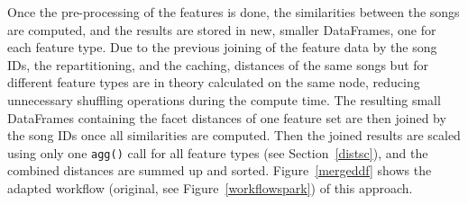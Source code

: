\noindent Once the pre-processing of the features is done, the similarities between the songs are computed, and the results are stored in new, smaller DataFrames, one for each feature type. Due to the previous joining of the feature data by the song IDs, the repartitioning, and the caching, distances of the same songs but for different feature types are in theory calculated on the same node, reducing unnecessary shuffling operations during the compute time. The resulting small DataFrames containing the facet distances of one feature set are then joined by the song IDs once all similarities are computed. Then the joined results are scaled using only one \lstinline{agg()} call for all feature types (see Section~\ref{distsc}), and the combined distances are summed up and sorted.
\noindent Figure~\ref{mergeddf} shows the adapted workflow (original, see Figure~\ref{workflowspark}) of this approach.\\

